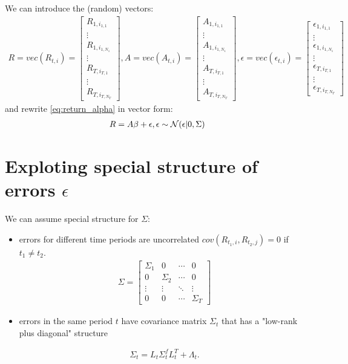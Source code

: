 We can introduce the (random) vectors:
\begin{align}
	R = vec(R_{t,i}) = \begin{bmatrix}R_{1,i_{1,1}} \\ \vdots \\  R_{1,i_{1, N_1}} \\ \vdots \\ R_{T,i_{T,1}} \\ \vdots \\  R_{T,i_{T,N_T}} 
		\end{bmatrix},
	A = vec(A_{t,i}) = \begin{bmatrix}A_{1,i_{1,1}} \\ \vdots \\  A_{1,i_{1, N_1}} \\ \vdots \\ A_{T,i_{T,1}} \\ \vdots \\  A_{T,i_{T,N_T}} 
\end{bmatrix},
	\epsilon = vec(\epsilon_{t,i}) = \begin{bmatrix}\epsilon_{1,i_{1,1}} \\ \vdots \\  \epsilon_{1,i_{1, N_1}} \\ \vdots \\ \epsilon_{T,i_{T,1}} \\ \vdots \\  \epsilon_{T,i_{T,N_T}} 
\end{bmatrix}
\end{align}
and rewrite \autoref{eq:return_alpha} in vector form:
\begin{align}
	R = A \beta + \epsilon, \epsilon \sim \mathcal{N}(\epsilon| 0, \Sigma)
\end{align}

\section{Exploting special structure of errors $\epsilon$}

We can assume special structure for $\Sigma$:
\begin{itemize}
	\item errors for different time periods are uncorrelated $cov(R_{t_1, i}, R_{t_2, j})=0$ if $t_1 \neq t_2$.
\begin{align}
	\label{eq:block_diagonal_sigma}
	 \Sigma =
\begin{bmatrix}
	\Sigma_1 & 0 & \cdots & 0 \\
	0 & \Sigma_2 & \cdots & 0 \\
	\vdots & \vdots & \ddots & \vdots \\
	0 & 0 & \cdots & \Sigma_T
\end{bmatrix}
\end{align}

	\item errors in the same period $t$ have covariance matrix $\Sigma_t$ that has a "low-rank plus diagonal" structure 
	
	\begin{align}
	\Sigma_t = L_t \Sigma^f_t L_t^T + \Lambda_t.
	\end{align}
\end{itemize}

